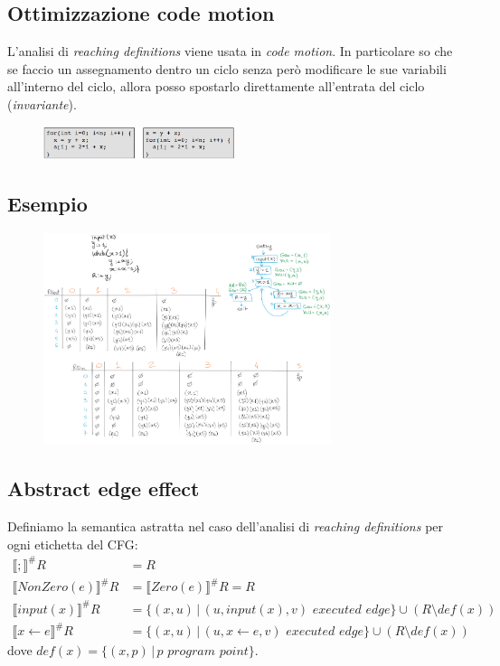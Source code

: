 \documentclass[a4paper,oneside,titlepage]{book}
\begin{document}
\subsection{Ottimizzazione code motion}
L'analisi di \textit{reaching definitions} viene usata in \textit{code motion}. In particolare so che se faccio un assegnamento dentro un ciclo senza però modificare le sue variabili all'interno del ciclo, allora posso spostarlo direttamente all'entrata del ciclo (\textit{invariante}).
\begin{figure}[htp]
	\centering
	\includegraphics[width=0.5\textwidth]{rd3.png}
\end{figure}

\subsection{Esempio}
\label{rd4}
\begin{figure}[htp]
	\centering
	\includegraphics[width=0.75\textwidth]{rd2.png}
\end{figure}

\subsection{Abstract edge effect}
\label{rd3}
Definiamo la semantica astratta nel caso dell'analisi di \textit{reaching definitions} per ogni etichetta del CFG:
\begin{align*}
    \llbracket ; \rrbracket^\# R &= R \\
    \llbracket NonZero(e) \rrbracket^\# R &= \llbracket Zero(e) \rrbracket^\# R = R \\
    \llbracket input(x) \rrbracket^\# R &= \{ (x,u) \, | \, (u,input(x),v) \,\, executed \,\, edge \} \cup (R \setminus def(x)) \\
    \llbracket x \leftarrow e \rrbracket^\# R &= \{ (x,u) \, | \, (u,x \leftarrow e,v) \,\, executed \,\, edge \} \cup (R \setminus def(x))
\end{align*}
dove $def(x) = \{ (x,p) \, | \, p \,\,program \,\, point \}$.
\end{document}

